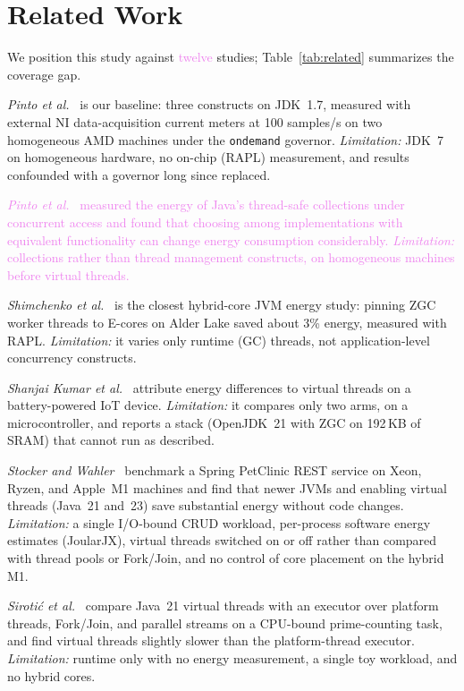 \documentclass[sigconf,nonacm]{acmart}
\newcommand{\changed}[1]{#1}
\newcommand{\upd}[1]{\textcolor{violet}{#1}}
\begin{document}
\section{Related Work}\label{sec:related}
We position \changed{this study} against \upd{twelve} studies; Table~\ref{tab:related} summarizes the coverage gap.

\emph{Pinto et al.}~\cite{pinto2014energy} is our baseline: three constructs on JDK~1.7, measured with external NI data-acquisition current meters at 100 samples/s on two homogeneous AMD machines under the \texttt{ondemand} governor. \emph{Limitation:} JDK~7 on homogeneous hardware, no on-chip (RAPL) measurement, and results confounded with a governor long since replaced.

\upd{\emph{Pinto et al.}~\cite{pinto2016collections} measured the energy of Java's thread-safe collections under concurrent access and found that choosing among implementations with equivalent functionality can change energy consumption considerably. \emph{Limitation:} collections rather than thread management constructs, on homogeneous machines before virtual threads.}

\emph{Shimchenko et al.}~\cite{shimchenko2024scheduling} is the closest hybrid-core JVM energy study: pinning ZGC worker threads to E-cores on Alder Lake saved about 3\% energy, measured with RAPL. \emph{Limitation:} it varies only runtime (GC) threads, not application-level concurrency constructs.

\emph{Shanjai Kumar et al.}~\cite{shanjaikumar2026virtualthreads} \changed{attribute} energy differences to virtual threads \changed{on a battery-powered IoT device}. \emph{Limitation:} it compares only two arms, on a microcontroller, and reports a stack (OpenJDK~21 with ZGC on 192\,KB of SRAM) that cannot run as described.

\changed{\emph{Stocker and Wahler}~\cite{stocker2026energyupgrades} benchmark a Spring PetClinic REST service on Xeon, Ryzen, and Apple~M1 machines and find that newer JVMs and enabling virtual threads (Java~21 and~23) save substantial energy without code changes. \emph{Limitation:} a single I/O-bound CRUD workload, per-process software energy estimates (JoularJX), virtual threads switched on or off rather than compared with thread pools or Fork/Join, and no control of core placement on the hybrid M1.}

\changed{\emph{Siroti{\'c} et al.}~\cite{sirotic2025virtual} compare Java~21 virtual threads with an executor over platform threads, Fork/Join, and parallel streams on a CPU-bound prime-counting task, and find virtual threads slightly slower than the platform-thread executor. \emph{Limitation:} runtime only with no energy measurement, a single toy workload, and no hybrid cores.}
\end{document}
